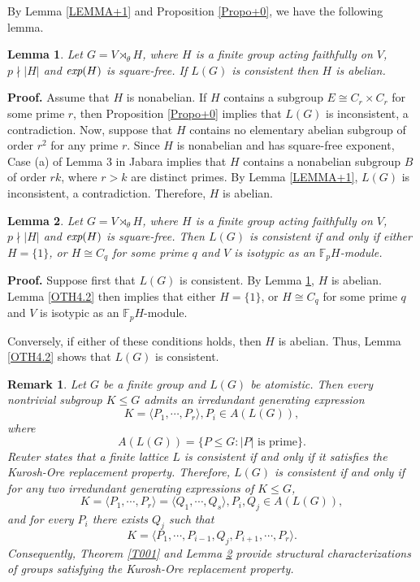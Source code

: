 \documentclass[12pt]{article}
\newtheorem{lemma}{\bf Lemma}[section]
\newtheorem{remark}{\bf Remark}[section]
\def\QEDopen{{\setlength{\fboxsep}{0pt}\setlength{\fboxrule}{0.2pt}\fbox{\rule[0pt]{0pt}{1.3ex}\rule[0pt]{1.3ex}{0pt}}}}
\def\QED{\QEDopen}
\def\proof{{\bf Proof.} }
\def\endproof{\hspace*{\fill}~\QED\par\endtrivlist\unskip}
\begin{document}
By Lemma \ref{LEMMA+1} and Proposition \ref{Propo+0}, we have the following lemma.
\begin{lemma}\label{LP}
Let $G=V\rtimes_{\theta}H$, where $H$ is a finite group acting faithfully on $V$, $p\nmid |H|$ and $\emph{exp}(H)$ is square-free. If $L(G)$ is consistent then $H$ is abelian.
\end{lemma}
\proof
Assume that $H$ is nonabelian. If $H$ contains a subgroup $E\cong C_r\times C_r$ for some prime $r$, then Proposition \ref{Propo+0} implies that $L(G)$ is inconsistent, 
a contradiction. Now, suppose that $H$ contains no elementary abelian subgroup of order $r^2$ for any prime $r$. Since $H$ is nonabelian 
and has square-free exponent, Case (a) of Lemma 3 in Jabara \cite{Jabara} implies that $H$ contains a nonabelian subgroup $B$ of order $rk$, where $r>k$ are distinct primes. 
By Lemma \ref{LEMMA+1}, $L(G)$ is inconsistent, a contradiction. Therefore, $H$ is abelian.
\endproof

\begin{lemma}\label{TH4.2}
Let $G=V\rtimes_{\theta} H$, where $H$ is a finite group acting faithfully on $V$, $p\nmid |H|$ and $\emph{exp}(H)$ is square-free. Then $L(G)$ is consistent if and only if either $H=\{1\}$, or $H\cong C_q$ for some prime $q$ and $V$ is isotypic as an $\mathbb{F}_pH$-module.
\end{lemma}
\proof Suppose first that $L(G)$ is consistent. 
By Lemma \ref{LP}, $H$ is abelian. Lemma \ref{OTH4.2} then implies that 
either $H=\{1\}$, or $H\cong C_q$ for some prime $q$ and $V$ is isotypic as an 
$\mathbb{F}_pH$-module.

 Conversely, if either of these conditions holds, then $H$ 
is abelian. Thus, Lemma \ref{OTH4.2} shows that $L(G)$ is consistent.
\endproof


\begin{remark}
\emph{Let $G$ be a finite group and $L(G)$ be atomistic. Then 
every nontrivial subgroup $K\leq G$ admits an irredundant 
generating expression
$$K=\langle P_1,\cdots,P_r\rangle, P_i\in A(L(G)),$$
where $$A(L(G))=\{P\leq G: |P| \mbox{ is prime}\}.$$
Reuter \cite{Reuter} states that a finite lattice $L$ is 
consistent if and only if it satisfies the Kurosh-Ore 
replacement property. Therefore, $L(G)$ is consistent if and only if 
for any two irredundant generating expressions of $K\leq G$,
$$K=\langle P_1,\cdots,P_r\rangle=\langle Q_1,\cdots,Q_s\rangle, P_i, Q_j\in A(L(G)),$$ 
and for every $P_i$ there exists $Q_j$ such that
$$K=\langle P_1,\cdots,P_{i-1},Q_j, P_{i+1},\cdots,P_r
\rangle .$$
Consequently, Theorem \ref{T001} and Lemma \ref{TH4.2} provide structural characterizations of groups satisfying the Kurosh-Ore replacement property.} 
\end{remark}
\end{document}
